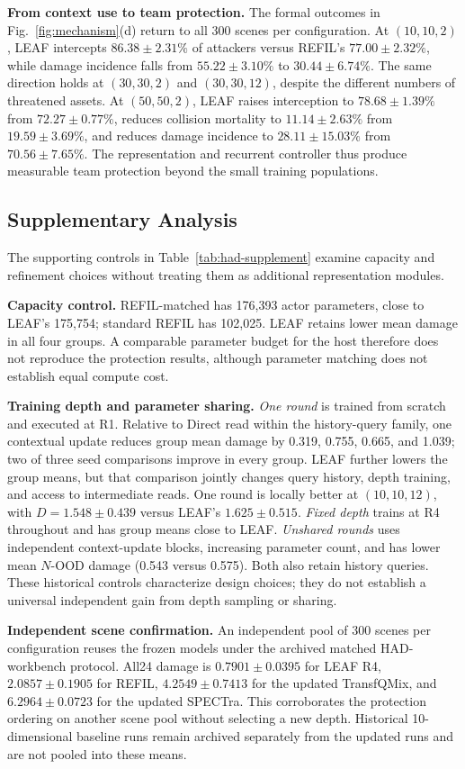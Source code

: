 \noindent\textbf{From context use to team protection.}
The formal outcomes in Fig.~\ref{fig:mechanism}(d) return to all 300 scenes per configuration. At $(10,10,2)$, LEAF intercepts $86.38\pm2.31\%$ of attackers versus REFIL's $77.00\pm2.32\%$, while damage incidence falls from $55.22\pm3.10\%$ to $30.44\pm6.74\%$. The same direction holds at $(30,30,2)$ and $(30,30,12)$, despite the different numbers of threatened assets. At $(50,50,2)$, LEAF raises interception to $78.68\pm1.39\%$ from $72.27\pm0.77\%$, reduces collision mortality to $11.14\pm2.63\%$ from $19.59\pm3.69\%$, and reduces damage incidence to $28.11\pm15.03\%$ from $70.56\pm7.65\%$. The representation and recurrent controller thus produce measurable team protection beyond the small training populations.

\subsection{Supplementary Analysis}
\label{subsec:supplement}
The supporting controls in Table~\ref{tab:had-supplement} examine capacity and refinement choices without treating them as additional representation modules.

\noindent\textbf{Capacity control.}
REFIL-matched has 176,393 actor parameters, close to LEAF's 175,754; standard REFIL has 102,025. LEAF retains lower mean damage in all four groups. A comparable parameter budget for the host therefore does not reproduce the protection results, although parameter matching does not establish equal compute cost.

\noindent\textbf{Training depth and parameter sharing.}
\emph{One round} is trained from scratch and executed at R1. Relative to Direct read within the history-query family, one contextual update reduces group mean damage by 0.319, 0.755, 0.665, and 1.039; two of three seed comparisons improve in every group. LEAF further lowers the group means, but that comparison jointly changes query history, depth training, and access to intermediate reads. One round is locally better at $(10,10,12)$, with $D=1.548\pm0.439$ versus LEAF's $1.625\pm0.515$. \emph{Fixed depth} trains at R4 throughout and has group means close to LEAF. \emph{Unshared rounds} uses independent context-update blocks, increasing parameter count, and has lower mean $N$-OOD damage (0.543 versus 0.575). Both also retain history queries. These historical controls characterize design choices; they do not establish a universal independent gain from depth sampling or sharing.


\noindent\textbf{Independent scene confirmation.}
An independent pool of 300 scenes per configuration reuses the frozen models under the archived matched HAD-workbench protocol. All24 damage is $0.7901\pm0.0395$ for LEAF R4, $2.0857\pm0.1905$ for REFIL, $4.2549\pm0.7413$ for the updated TransfQMix, and $6.2964\pm0.0723$ for the updated SPECTra. This corroborates the protection ordering on another scene pool without selecting a new depth. Historical 10-dimensional baseline runs remain archived separately from the updated runs and are not pooled into these means.
